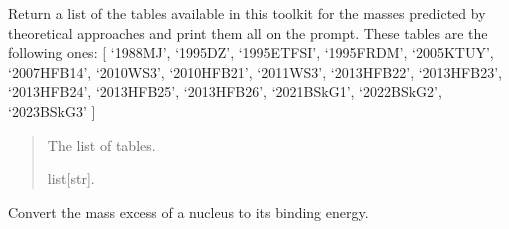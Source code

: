 \documentclass[letterpaper,10pt,english]{sphinxmanual}
\begin{document}
\begin{fulllineitems}
\label{\detokenize{source/api/setup_nuc_be_theo:nucleardatapy.nuc.setup_be_theo.be_theo_tables}}
\pysigstartsignatures
{}
\pysigstopsignatures
\sphinxAtStartPar
Return a list of the tables available in this toolkit for the masses
predicted by theoretical approaches and print them all on the prompt.
These tables are the following ones:     {[} ‘1988\sphinxhyphen{}MJ’, ‘1995\sphinxhyphen{}DZ’, ‘1995\sphinxhyphen{}ETFSI’, ‘1995\sphinxhyphen{}FRDM’,     ‘2005\sphinxhyphen{}KTUY’, ‘2007\sphinxhyphen{}HFB14’, ‘2010\sphinxhyphen{}WS3’, ‘2010\sphinxhyphen{}HFB21’, ‘2011\sphinxhyphen{}WS3’, ‘2013\sphinxhyphen{}HFB22’,     ‘2013\sphinxhyphen{}HFB23’, ‘2013\sphinxhyphen{}HFB24’, ‘2013\sphinxhyphen{}HFB25’, ‘2013\sphinxhyphen{}HFB26’, ‘2021\sphinxhyphen{}BSkG1’,     ‘2022\sphinxhyphen{}BSkG2’, ‘2023\sphinxhyphen{}BSkG3’ {]}
\begin{quote}\begin{description}
\sphinxAtStartPar
The list of tables.

\sphinxAtStartPar
list{[}str{]}.

\end{description}\end{quote}

\end{fulllineitems}


\begin{fulllineitems}
\label{\detokenize{source/api/setup_nuc_be_theo:nucleardatapy.nuc.setup_be_theo.conversionMBE}}
\pysigstartsignatures
{}
\pysigstopsignatures
\sphinxAtStartPar
Convert the mass excess of a nucleus to its binding energy.

\end{fulllineitems}

\end{document}
